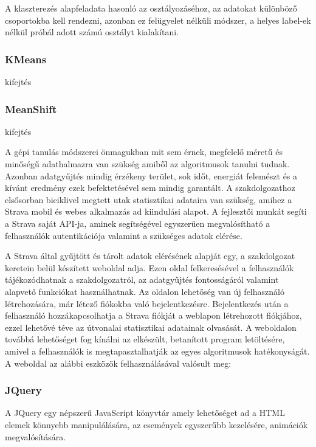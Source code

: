  \label{ssec:klaszterezes}
A klaszterezés alapfeladata hasonló az osztályozáséhoz, az adatokat különböző csoportokba kell rendezni, azonban ez felügyelet nélküli módszer, a helyes label-ek nélkül próbál adott számú osztályt kialakítani. 
\subsubsection{KMeans}
\TODO kifejtés

\subsubsection{MeanShift}
\TODO kifejtés




A gépi tanulás módszerei önmagukban mit sem érnek, megfelelő méretű és minőségű adathalmazra van szükség amiből az algoritmusok tanulni tudnak. Azonban adatgyűjtés mindig érzékeny terület, sok időt, energiát felemészt és a kívánt eredmény ezek befektetésével sem mindig garantált. A szakdolgozathoz elsősorban biciklivel megtett utak statisztikai adataira van szükség, amihez a Strava mobil és webes alkalmazás ad kiindulási alapot. A fejlesztői munkát segíti a Strava saját API-ja, aminek segítségével egyszerűen megvalósítható a felhasználók autentikációja valamint a szükséges adatok elérése. 

A Strava által gyűjtött és tárolt adatok elérésének alapját egy, a szakdolgozat keretein belül készített weboldal adja. Ezen oldal felkeresésével a felhasználók tájékozódhatnak a szakdolgozatról, az adatgyűjtés fontosságáról valamint alapvető funkciókat használhatnak. Az oldalon lehetőség van új felhasználó létrehozására, már létező fiókokba való bejelentkezésre. Bejelentkezés után a felhasználó hozzákapcsolhatja a Strava fiókját a weblapon létrehozott fiókjához, ezzel lehetővé téve az útvonalai statisztikai adatainak olvasását. A weboldalon továbbá lehetőséget fog kínálni az elkészült, betanított program letöltésére, amivel a felhasználók is megtapasztalhatják az egyes algoritmusok hatékonyságát. A weboldal az alábbi eszközök felhasználásával valósult meg:

\subsubsection{JQuery}
A JQuery egy népszerű JavaScript könyvtár amely lehetőséget ad a HTML elemek könnyebb manipulálására, az események egyszerűbb kezelésére, animációk megvalósítására.

